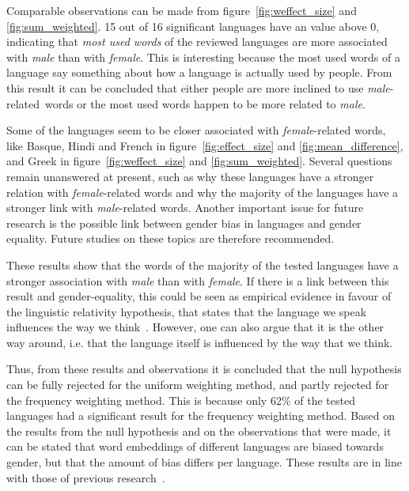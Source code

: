 Comparable observations can be made from figure~\ref{fig:weffect_size} and
\ref{fig:sum_weighted}. 15 out of 16 significant 
languages have an value above 0, indicating that \emph{most used words} of the
reviewed languages are more associated with \emph{male} than with \emph{female}. This
is interesting because the most used words of a language say something about how a
language is actually used by people.
From this result it can be concluded that either people are more inclined to use
\mbox{\emph{male}-related words} or the most used words happen to be more related
to \mbox{\emph{male}}.

Some of the languages seem to be closer associated with \emph{female}-related words, like
Basque, Hindi and French in figure~\ref{fig:effect_size} and \ref{fig:mean_difference},
and Greek in figure~\ref{fig:weffect_size} and \ref{fig:sum_weighted}. 
Several questions remain unanswered at present, such as why these languages have a stronger
relation with \emph{female}-related words and why the majority of the languages have
a stronger link with \emph{male}-related words. 
Another important issue for future research is the possible link between gender bias
in languages and gender equality. 
Future studies on these topics are therefore recommended.

These results show that the words of the majority of the tested languages have
a stronger association with \emph{male} than with \emph{female}. If there is a link
between this result and gender-equality, this could be seen as empirical evidence
in favour of the linguistic relativity hypothesis, that states that the
language we speak influences the way we think~\parencite{lucy_linguistic_1997}.
However, one can also argue that it is the other way around, i.e. that the language itself
is influenced by the way that we think.

Thus, from these results and observations it is concluded that the null
hypothesis can be fully rejected for the uniform weighting method, and partly rejected for
the frequency weighting method. This is because only 62\% of the tested languages had a
significant result for the frequency weighting method.
Based on the results from the null hypothesis and on the observations that were made,
it can be stated that word embeddings of different languages
are biased towards gender, but that the amount of bias differs per language.
These results are in line with those of previous research~\parencite{caliskan_2017_semantics_language_corpora}.

